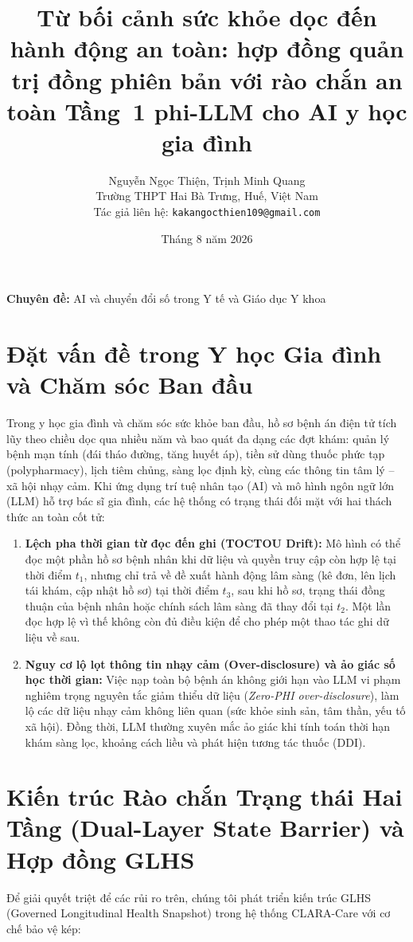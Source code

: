 \documentclass[11pt]{article}
\title{\textbf{Từ bối cảnh sức khỏe dọc đến hành động an toàn: hợp đồng quản trị đồng phiên bản với rào chắn an toàn Tầng~1 phi-LLM cho AI y học gia đình}}
\author{Nguyễn Ngọc Thiện, Trịnh Minh Quang\\
Trường THPT Hai Bà Trưng, Huế, Việt Nam\\
Tác giả liên hệ: \texttt{kakangocthien109@gmail.com}}
\date{Tháng 8 năm 2026}
\begin{document}
\maketitle
\thispagestyle{empty}

\textbf{Chuyên đề:} AI và chuyển đổi số trong Y tế và Giáo dục Y khoa

\section{Đặt vấn đề trong Y học Gia đình và Chăm sóc Ban đầu}
Trong y học gia đình và chăm sóc sức khỏe ban đầu, hồ sơ bệnh án điện tử tích lũy theo chiều dọc qua nhiều năm và bao quát đa dạng các đợt khám: quản lý bệnh mạn tính (đái tháo đường, tăng huyết áp), tiền sử dùng thuốc phức tạp (polypharmacy), lịch tiêm chủng, sàng lọc định kỳ, cùng các thông tin tâm lý -- xã hội nhạy cảm. Khi ứng dụng trí tuệ nhân tạo (AI) và mô hình ngôn ngữ lớn (LLM) hỗ trợ bác sĩ gia đình, các hệ thống có trạng thái đối mặt với hai thách thức an toàn cốt tử:

\begin{enumerate}[leftmargin=1.8em]
\item \textbf{Lệch pha thời gian từ đọc đến ghi (TOCTOU Drift):} Mô hình có thể đọc một phần hồ sơ bệnh nhân khi dữ liệu và quyền truy cập còn hợp lệ tại thời điểm $t_1$, nhưng chỉ trả về đề xuất hành động lâm sàng (kê đơn, lên lịch tái khám, cập nhật hồ sơ) tại thời điểm $t_3$, sau khi hồ sơ, trạng thái đồng thuận của bệnh nhân hoặc chính sách lâm sàng đã thay đổi tại $t_2$. Một lần đọc hợp lệ vì thế không còn đủ điều kiện để cho phép một thao tác ghi dữ liệu về sau.
\item \textbf{Nguy cơ lộ lọt thông tin nhạy cảm (Over-disclosure) và ảo giác số học thời gian:} Việc nạp toàn bộ bệnh án không giới hạn vào LLM vi phạm nghiêm trọng nguyên tắc giảm thiểu dữ liệu (\emph{Zero-PHI over-disclosure}), làm lộ các dữ liệu nhạy cảm không liên quan (sức khỏe sinh sản, tâm thần, yếu tố xã hội). Đồng thời, LLM thường xuyên mắc ảo giác khi tính toán thời hạn khám sàng lọc, khoảng cách liều và phát hiện tương tác thuốc (DDI).
\end{enumerate}

\section{Kiến trúc Rào chắn Trạng thái Hai Tầng (Dual-Layer State Barrier) và Hợp đồng GLHS}
Để giải quyết triệt để các rủi ro trên, chúng tôi phát triển kiến trúc GLHS (Governed Longitudinal Health Snapshot) trong hệ thống CLARA-Care với cơ chế bảo vệ kép:
\end{document}
